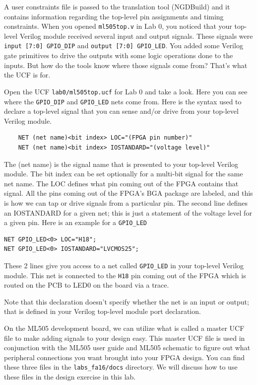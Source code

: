 \documentclass[11pt]{article}
\begin{document}
A user constraints file is passed to the translation tool (NGDBuild) and it contains information regarding the top-level pin assignments and timing constraints. When you opened \verb|ml505top.v| in Lab 0, you noticed that your top-level Verilog module received several input and output signals. These signals were \verb|input [7:0] GPIO_DIP| and \verb|output [7:0] GPIO_LED|. You added some Verilog gate primitives to drive the outputs with some logic operations done to the inputs. But how do the tools know where those signals come from? That's what the UCF is for.

Open the UCF \verb|lab0/ml505top.ucf| for Lab 0 and take a look. Here you can see where the \verb|GPIO_DIP| and \verb|GPIO_LED| nets come from. Here is the syntax used to declare a top-level signal that you can sense and/or drive from your top-level Verilog module.

\begin{verbatim}
	NET (net name)<bit index> LOC="(FPGA pin number)"
	NET (net name)<bit index> IOSTANDARD="(voltage level)"
\end{verbatim}

The (net name) is the signal name that is presented to your top-level Verilog module. The bit index can be set optionally for a multi-bit signal for the same net name. The LOC defines what pin coming out of the FPGA contains that signal. All the pins coming out of the FPGA's BGA package are labeled, and this is how we can tap or drive signals from a particular pin. The second line defines an IOSTANDARD for a given net; this is just a statement of the voltage level for a given pin. Here is an example for a \verb|GPIO_LED|

\begin{verbatim}
NET GPIO_LED<0> LOC="H18";
NET GPIO_LED<0> IOSTANDARD="LVCMOS25";
\end{verbatim}

These 2 lines give you access to a net called \verb|GPIO_LED| in your top-level Verilog module. This net is connected to the \verb|H18| pin coming out of the FPGA which is routed on the PCB to LED0 on the board via a trace.

Note that this declaration doesn't specify whether the net is an input or output; that is defined in your Verilog top-level module port declaration.

On the ML505 development board, we can utilize what is called a master UCF file to make adding signals to your design easy. This master UCF file is used in conjunction with the ML505 user guide and ML505 schematic to figure out what peripheral connections you want brought into your FPGA design. You can find these three files in the \verb|labs_fa16/docs| directory. We will discuss how to use these files in the design exercise in this lab.
\end{document}
